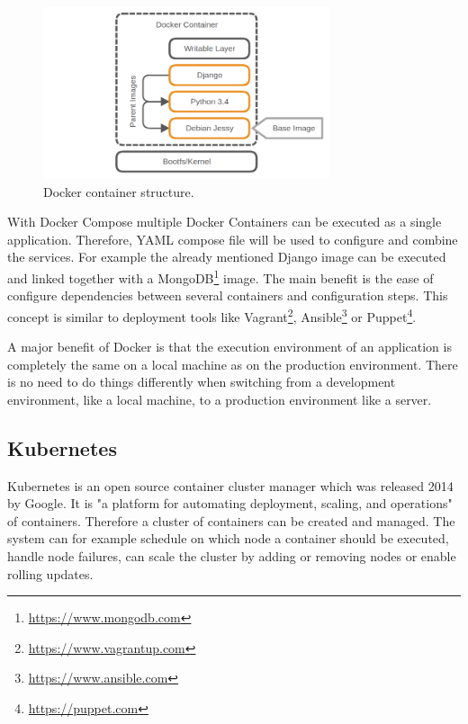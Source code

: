\begin{figure}[H]
    \centering
    \includegraphics[width=0.75\textwidth]{resources/images/docker_container_structure.png}
    \caption[Docker container structure]{Docker container structure.}
    \label{fig:docker_container_structure}
\end{figure}

With Docker Compose multiple Docker Containers can be executed as a single application.
Therefore, YAML compose file will be used to configure and combine the services.
For example the already mentioned Django image can be executed and linked together with a MongoDB\footnote{\url{https://www.mongodb.com}} image.
The main benefit is the ease of configure dependencies between several containers and configuration steps.
This concept is similar to deployment tools like Vagrant\footnote{\url{https://www.vagrantup.com}}, Ansible\footnote{\url{https://www.ansible.com}} or Puppet\footnote{\url{https://puppet.com}}.

A major benefit of Docker is that the execution environment of an application is completely the same on a local machine as on the production environment.\autocite[cf.][p. 2]{Gallagher:2015}
There is no need to do things differently when switching from a development environment, like a local machine, to a production environment like a server.\autocite[cf.][p. 2]{Gallagher:2015}

\subsection{Kubernetes}
\label{subsection:state-of-the-art:kubernetes}
Kubernetes is an open source container cluster manager which was released 2014 by Google.
It is "a platform for automating deployment, scaling, and operations"\autocite[p. 1]{Grant:2015} of containers.
Therefore a cluster of containers can be created and managed.
The system can for example schedule on which node a container should be executed, handle node failures, can scale the cluster by adding or removing nodes or enable rolling updates.\autocite[p. 5 f.]{Grant:2015}

